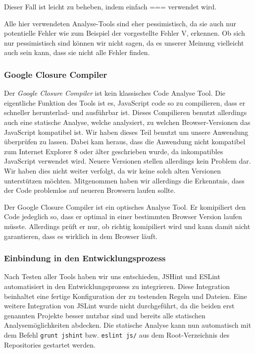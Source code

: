 \documentclass[ngerman]{article}
\begin{document}
Dieser Fall ist leicht zu beheben, indem einfach === verwendet wird.

Alle hier verwendeten Analyse-Tools sind eher pessimistisch, da sie auch nur potentielle Fehler wie zum Beispiel der vorgestellte Fehler V, erkennen. Ob sich nur pessimistisch sind können wir nicht sagen, da es unserer Meinung vielleicht auch sein kann, dass sie nicht alle Fehler finden.

\subsubsection{Google Closure Compiler}
Der \emph{Google Closure Compiler} ist kein klassisches Code Analyse Tool.
Die eigentliche Funktion des Tools ist es, JavaScript code so zu compilieren, dass er schneller herunterlad- und ausführbar ist.
Dieses Compilieren benutzt allerdings auch eine statische Analyse, welche analysiert, zu welchen Browser-Versionen das JavaScript kompatibel ist.
Wir haben dieses Teil benutzt um unsere Anwendung überprüfen zu lassen.
Dabei kam heraus, dass die Anwendung nicht kompatibel zum Internet Explorer 8 oder älter geschrieben wurde, da inkompatibles JavaScript verwendet wird.
Neuere Versionen stellen allerdings kein Problem dar.
Wir haben dies nicht weiter verfolgt, da wir keine solch alten Versionen unterstützen möchten.
Mitgenommen haben wir allerdings die Erkenntnis, dass der Code problemlos auf neueren Browsern laufen sollte.

Der Google Closure Compiler ist ein optisches Analyse Tool. Er komipiliert den Code jedeglich so, dass er optimal in einer bestimmten Browser Version laufen müsste. Allerdings prüft er nur, ob richtig komipiliert wird und kann damit nicht garantieren, dass es wirklich in dem Browser läuft.

\subsubsection{Einbindung in den Entwicklungsprozess}
Nach Testen aller Tools haben wir uns entschieden, JSHint und ESLint automatisiert in den Entwicklungsprozess zu integrieren.
Diese Integration beinhaltet eine fertige Konfiguration der zu testenden Regeln und Dateien.
Eine weitere Integration von JSLint wurde nicht durchgeführt, da die beiden erst genannten Projekte besser nutzbar sind und bereits alle statischen Analysemöglichkeiten abdecken.
Die statische Analyse kann nun automatisch mit dem Befehl \texttt{grunt jshint} bzw. \texttt{eslint js/} aus dem Root-Verzeichnis des Repositories gestartet werden.
\end{document}
